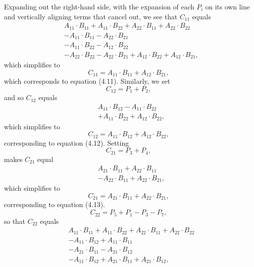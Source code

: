 \documentclass{report}
\begin{document}
        \bigbreak \noindent 
        Expanding out the right-hand side, with the expansion of each \(P_i\) on its own line and vertically aligning terms that cancel out, we see that \(C_{11}\) equals
        \[
            \begin{aligned}
    & A_{11} \cdot B_{11} + A_{11} \cdot B_{22} + A_{22} \cdot B_{11} + A_{22} \cdot B_{22} \\
    & - A_{11} \cdot B_{11} - A_{22} \cdot B_{21} \\
    & - A_{11} \cdot B_{22} - A_{12} \cdot B_{22} \\
    & - A_{22} \cdot B_{22} - A_{22} \cdot B_{21} + A_{12} \cdot B_{22} + A_{12} \cdot B_{21},
            \end{aligned}
        \]
        which simplifies to
        \[
            C_{11} = A_{11} \cdot B_{11} + A_{12} \cdot B_{21},
        \]
        which corresponds to equation (4.11).
        \bigbreak \noindent 
        Similarly, we set
        \[
            C_{12} = P_1 + P_2,
        \]
        and so \(C_{12}\) equals
        \[
            \begin{aligned}
    & A_{11} \cdot B_{12} - A_{11} \cdot B_{22} \\
    & + A_{11} \cdot B_{22} + A_{12} \cdot B_{22},
            \end{aligned}
        \]
        which simplifies to
        \[
            C_{12} = A_{11} \cdot B_{12} + A_{12} \cdot B_{22},
        \]
        corresponding to equation (4.12).
        \bigbreak \noindent 
        Setting
        \[
            C_{21} = P_3 + P_4,
        \]
        makes \(C_{21}\) equal
        \[
            \begin{aligned}
    & A_{21} \cdot B_{11} + A_{22} \cdot B_{11} \\
    & - A_{22} \cdot B_{11} + A_{22} \cdot B_{21},
            \end{aligned}
        \]
        which simplifies to
        \[
            C_{21} = A_{21} \cdot B_{11} + A_{22} \cdot B_{21},
        \]
        corresponding to equation (4.13).
        \bigbreak \noindent 
        \[
            C_{22} = P_5 + P_1 - P_3 - P_7,
        \]
        so that \(C_{22}\) equals
        \[
            \begin{aligned}
    & A_{11} \cdot B_{11} + A_{11} \cdot B_{22} + A_{22} \cdot B_{11} + A_{22} \cdot B_{22} \\
    & - A_{11} \cdot B_{12} + A_{11} \cdot B_{11} \\
    & - A_{21} \cdot B_{11} - A_{21} \cdot B_{12} \\
    & - A_{11} \cdot B_{12} + A_{21} \cdot B_{11} + A_{21} \cdot B_{12},
            \end{aligned}
        \]
\end{document}
